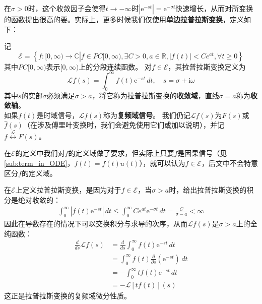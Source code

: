 在$\sigma>0$时，这个收敛因子会使得$t\to -\infty$时$|\mathrm{e}^{-st}|=\mathrm{e}^{-\sigma t}$快速增长，从而对所变换的函数提出很高的要。实际上，更多时候我们仅使用\textbf{单边拉普拉斯变换}，定义如下\cite{folland}：
\begin{definition}[单边拉普拉斯变换]
    记\[\mathcal{E}=\left\{f:[0,\infty)\to\mathbb{C}\left|f\in PC[0,\infty),\exists C>0,a\in\mathbb{R},|f(t)|<Ce^{at},\forall t\geq 0\right.\right\}\]
    其中$PC[0,\infty)$表示$[0,\infty)$上的分段连续函数。
    对$f\in\mathcal{E}$，其拉普拉斯变换定义为
    \[\mathcal{L} f(s)=\int_{0}^{\infty}f(t)\mathrm{e}^{-st}\,dt,\quad s=\sigma+\mathrm{i}\omega\]
    其中$s$的实部$\sigma$必须满足$\sigma>a$，将它称为拉普拉斯变换的\textbf{收敛域}，直线$\sigma=a$称为\textbf{收敛轴}。\\
    如果$f(t)$是时域信号，$\mathcal{L} f(s)$称为\textbf{复频域信号}。
    我们仍记$\mathcal{L} f(s)$为$F(s)$或$\hat{f}(s)$（在涉及傅里叶变换时，我们会避免使用它们或加以说明），并记$f\overset{\mathcal{L} }{\longleftrightarrow} F(s)$。
\end{definition}
在$\mathcal{E} $的定义中我们对$f$的定义域做了要求，但实际上只要$f$是因果信号（见\ref{sub:term_in_ODE}，$f(t)=f(t)u(t)$），就可以认为$f\in\mathcal{E}$，后文中不会特意区分$f$的定义域。

在$\mathcal{E} $上定义拉普拉斯变换，是因为对于$f\in\mathcal{E} $，当$\sigma>a$时，给出拉普拉斯变换的积分是绝对收敛的：
\begin{align*}
    \int_0^{\infty}|f(t)\mathrm{e}^{-st}|\,dt\leq \int_0^{\infty}Ce^{at}\mathrm{e}^{-\sigma t}\,dt=\frac{C}{\sigma-a}<\infty
\end{align*}
因此在导数存在的情况下可以交换积分与求导的次序，从而$\mathcal{L} f(s)$是$\sigma>a$上的全纯函数：
\begin{align*}
    \frac{d}{ds}\mathcal{L} f(s)&=\frac{d}{ds}\int_0^{\infty}f(t)\mathrm{e}^{-st}\,dt\\
    &=\int_0^{\infty}f(t)\frac{\partial}{\partial s}(\mathrm{e}^{-st})\,dt\\
    &=-\int_0^{\infty}tf(t)\mathrm{e}^{-st}\,dt\\
    &=-\mathcal{L} [tf(t)](s)
\end{align*}
这正是拉普拉斯变换的复频域微分性质。

